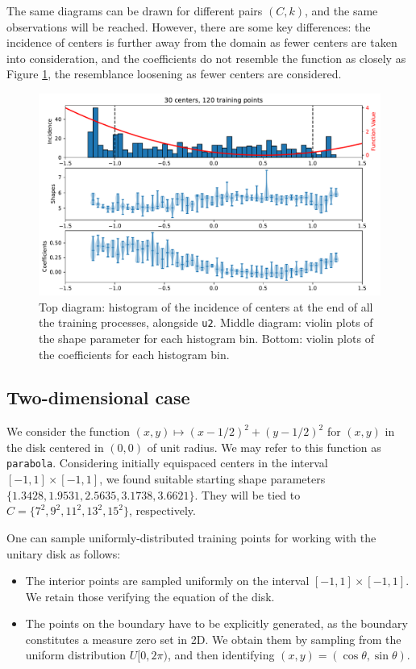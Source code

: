 \documentclass[12pt]{report} %
\begin{document}
The same diagrams can be drawn for different pairs $(C,k)$, and the same observations will be reached. However, there are some key differences: the incidence of centers is further away from the domain as fewer centers are taken into consideration, and the coefficients do not resemble the function as closely as Figure \ref{fig:u2-results-shapes-etc-c30-tr120}, the resemblance loosening as fewer centers are considered.

\begin{figure}
  \includegraphics[width=\textwidth]{imagenes/experiments/1d/statistical_1d_full_scheduler_interpolation/C30-TR120-u2.pdf}
  \caption{Top diagram: histogram of the incidence of centers at the end of all the training processes, alongside \texttt{u2}. Middle diagram: violin plots of the shape parameter for each histogram bin. Bottom: violin plots of the coefficients for each histogram bin.}
  \label{fig:u2-results-shapes-etc-c30-tr120}
\end{figure}



\clearpage
\subsection*{Two-dimensional case}

We consider the function $(x,y) \mapsto (x-1/2)^2 + (y-1/2)^2$ for $(x,y)$ in the disk centered in $(0,0)$ of unit radius. We may refer to this function as \texttt{parabola}. Considering initially equispaced centers in the interval $[-1,1]\times[-1,1]$, we found suitable starting shape parameters $\{1.3428, 1.9531, 2.5635, 3.1738, 3.6621\}$. They will be tied to $C=\{7^2,9^2,11^2,13^2,15^2\}$, respectively.

One can sample uniformly-distributed training points for working with the unitary disk as follows:
\begin{itemize}
  \item The interior points are sampled uniformly on the interval $[-1,1]\times[-1,1]$. We retain those verifying the equation of the disk.
  \item The points on the boundary have to be explicitly generated, as the boundary constitutes a measure zero set in 2D. We obtain them by sampling from the uniform distribution $U[0,2\pi)$, and then identifying $(x,y)=(\cos\theta, \sin\theta)$.
\end{itemize}
\end{document}
